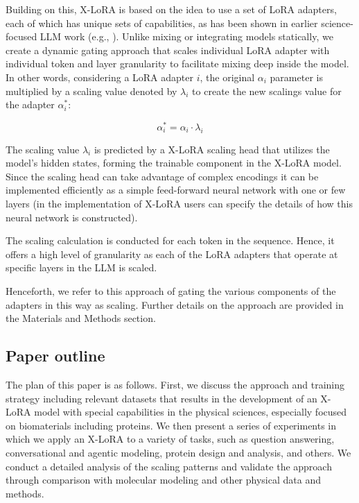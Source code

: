 Building on this, X-LoRA is based on the idea to use a set of LoRA adapters, each of which has unique sets of capabilities, as has been shown in earlier science-focused LLM work (e.g., \cite{Buehler2023GenerativeDesign}). Unlike mixing or integrating models statically, we create a dynamic gating approach that scales individual LoRA adapter with individual token and layer granularity to facilitate mixing deep inside the model. In other words, considering a LoRA adapter $i$, the original $\alpha_i$ parameter is multiplied by a scaling value denoted by $\lambda_i$ to create the new scalings value for the adapter $\alpha^*_i$:

\begin{equation}
    \alpha^*_i = \alpha_i \cdot \lambda_i
\end{equation}

The scaling value $\lambda_i$ is predicted by a X-LoRA scaling head that utilizes the model's hidden states, forming the trainable component in the X-LoRA model. Since the scaling head can take advantage of complex encodings it can be implemented efficiently as a simple feed-forward neural network with one or few layers (in the implementation of X-LoRA users can specify the details of how this neural network is constructed).

The scaling calculation is conducted for each token in the sequence. Hence, it offers a high level of granularity as each of the LoRA adapters that operate at specific layers in the LLM is scaled. 

Henceforth, we refer to this approach of gating the various components of the adapters in this way as scaling. Further details on the approach are provided in the Materials and Methods section.

\subsection{Paper outline}

The plan of this paper is as follows. First, we discuss the approach and training strategy including relevant datasets that results in the development of an X-LoRA model with special capabilities in the physical sciences, especially focused on biomaterials including proteins. We then present a series of experiments in which we apply an X-LoRA to a variety of tasks, such as question answering, conversational and agentic modeling, protein design and analysis, and others. We conduct a detailed analysis of the scaling patterns and validate the approach through comparison with molecular modeling and other physical data and methods. 

